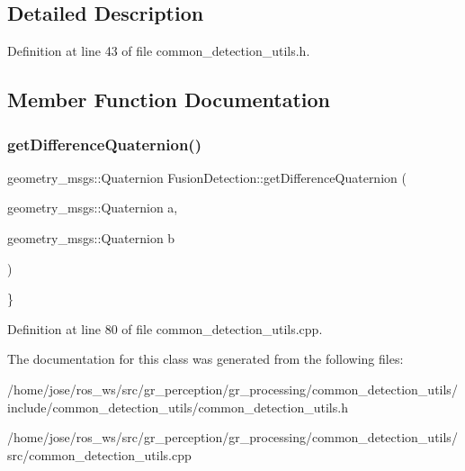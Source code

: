 \subsection{Detailed Description}


Definition at line 43 of file common\+\_\+detection\+\_\+utils.\+h.



\subsection{Member Function Documentation}
\mbox{\label{classgr__detection_1_1FusionDetection_adf2d2812d4191bcd819233dbc5cfd6f7}} 
\subsubsection{\texorpdfstring{get\+Difference\+Quaternion()}{getDifferenceQuaternion()}}
{\footnotesize\ttfamily geometry\+\_\+msgs\+::\+Quaternion Fusion\+Detection\+::get\+Difference\+Quaternion (\begin{DoxyParamCaption}\item[{geometry\+\_\+msgs\+::\+Quaternion}]{a,  }\item[{geometry\+\_\+msgs\+::\+Quaternion}]{b }\end{DoxyParamCaption})}

\} 

Definition at line 80 of file common\+\_\+detection\+\_\+utils.\+cpp.



The documentation for this class was generated from the following files\+:\begin{DoxyCompactItemize}
\item 
/home/jose/ros\+\_\+ws/src/gr\+\_\+perception/gr\+\_\+processing/common\+\_\+detection\+\_\+utils/include/common\+\_\+detection\+\_\+utils/common\+\_\+detection\+\_\+utils.\+h\item 
/home/jose/ros\+\_\+ws/src/gr\+\_\+perception/gr\+\_\+processing/common\+\_\+detection\+\_\+utils/src/common\+\_\+detection\+\_\+utils.\+cpp\end{DoxyCompactItemize}
